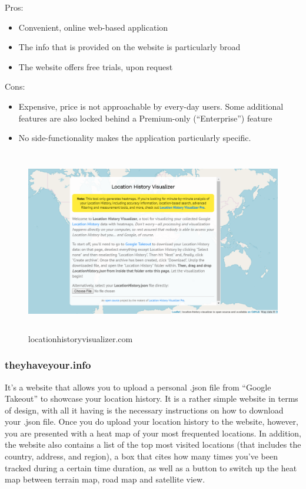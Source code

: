 \documentclass[12p]{article}
\begin{document}
Pros:
\begin{itemize}
    \item Convenient, online web-based application
    \item The info that is provided on the website is particularly broad
    \item The website offers free trials, upon request
\end{itemize}

Cons:
\begin{itemize}
    \item Expensive, price is not approachable by every-day users.  Some additional features are also locked behind a Premium-only (“Enterprise”) feature
    \item No side-functionality makes the application particularly specific.
\end{itemize}

\begin{figure}[ht]
	    \center
        \includegraphics[height=8cm,keepaspectratio]{pics/state-of-the-art/lochistory.png}
        \caption{locationhistoryvisualizer.com}
    \end{figure}

\subsubsection{theyhaveyour.info}
It’s a website that allows you to upload a personal .json file from “Google Takeout” to showcase your location history. It is a rather simple website in terms of design, with all it having is the necessary instructions on how to download your .json file. Once you do upload your location history to the website, however, you are presented with a heat map of your most frequented locations. In addition, the website also contains a list of the top most visited locations (that includes the country, address, and region), a box that cites how many times you’ve been tracked during a certain time duration, as well as a button to switch up the heat map between terrain map, road map and satellite view.
\end{document}
